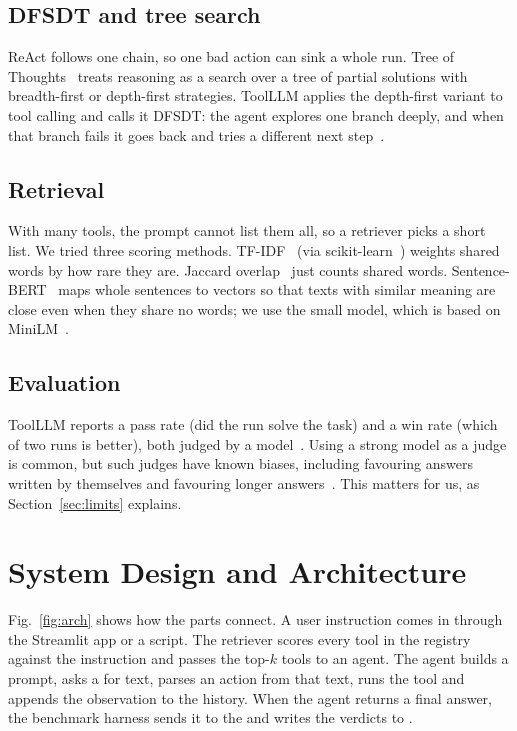 \documentclass[conference,a4paper]{IEEEtran}
\begin{document}
\subsection{DFSDT and tree search}
ReAct follows one chain, so one bad action can sink a whole run. Tree of
Thoughts~\cite{yao2023tot} treats reasoning as a search over a tree of
partial solutions with breadth-first or depth-first strategies. ToolLLM
applies the depth-first variant to tool calling and calls it DFSDT: the
agent explores one branch deeply, and when that branch fails it goes back
and tries a different next step~\cite{qin2024toolllm}.

\subsection{Retrieval}
With many tools, the prompt cannot list them all, so a retriever picks a
short list. We tried three scoring methods. TF-IDF~\cite{salton1988tfidf}
(via scikit-learn~\cite{pedregosa2011sklearn}) weights shared words by how
rare they are. Jaccard overlap~\cite{jaccard1912} just counts shared
words. Sentence-BERT~\cite{reimers2019sbert} maps whole sentences to
vectors so that texts with similar meaning are close even when they share
no words; we use the small  model, which is based
on MiniLM~\cite{wang2020minilm}.

\subsection{Evaluation}
ToolLLM reports a pass rate (did the run solve the task) and a win rate
(which of two runs is better), both judged by a model~\cite{qin2024toolllm}.
Using a strong model as a judge is common, but such judges have known
biases, including favouring answers written by themselves and favouring
longer answers~\cite{zheng2023judge}. This matters for us, as
Section~\ref{sec:limits} explains.

\section{System Design and Architecture}

Fig.~\ref{fig:arch} shows how the parts connect. A user instruction comes
in through the Streamlit app or a script. The retriever scores every tool
in the registry against the instruction and passes the top-$k$ tools to an
agent. The agent builds a prompt, asks a  for text, parses an
action from that text, runs the tool and appends the observation to the
history. When the agent returns a final answer, the benchmark harness
sends it to the  and writes the verdicts to .
\end{document}
